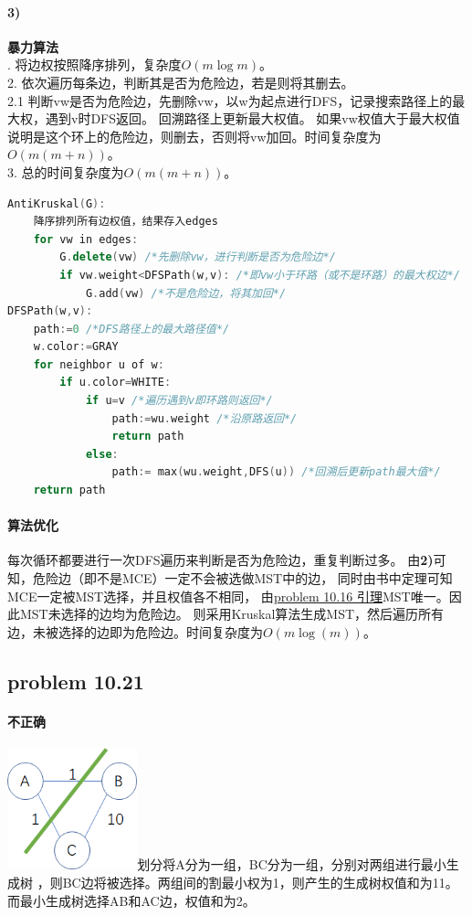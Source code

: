 \documentclass[11pt,a4paper,oneside,oldfontcommands]{ctexart}
\begin{document}
\paragraph*{3)}
\textbf{暴力算法}\\
. 将边权按照降序排列，复杂度$O(m\log m)$。\\
2. 依次遍历每条边，判断其是否为危险边，若是则将其删去。\\
2.1 判断vw是否为危险边，先删除vw，以w为起点进行DFS，记录搜索路径上的最大权，遇到v时DFS返回。
回溯路径上更新最大权值。
如果vw权值大于最大权值说明是这个环上的危险边，则删去，否则将vw加回。时间复杂度为$O(m(m+n))$。\\
3. 总的时间复杂度为$O(m(m+n))$。\\
\newpage
\begin{lstlisting}[language=C++,title=AntiKruskal.func]
AntiKruskal(G):
	降序排列所有边权值，结果存入edges
	for vw in edges:
		G.delete(vw) /*先删除vw，进行判断是否为危险边*/
		if vw.weight<DFSPath(w,v): /*即vw小于环路（或不是环路）的最大权边*/
			G.add(vw) /*不是危险边，将其加回*/
DFSPath(w,v):
	path:=0 /*DFS路径上的最大路径值*/
	w.color:=GRAY
	for neighbor u of w:
		if u.color=WHITE:
			if u=v /*遍历遇到v即环路则返回*/
				path:=wu.weight /*沿原路返回*/
				return path
			else:
				path:= max(wu.weight,DFS(u)) /*回溯后更新path最大值*/
	return path
\end{lstlisting}
\paragraph*{算法优化}
每次循环都要进行一次DFS遍历来判断是否为危险边，重复判断过多。
由\textbf{2)}可知，危险边（即不是MCE）一定不会被选做MST中的边，
同时由书中定理可知MCE一定被MST选择，并且权值各不相同，
由\hyperlink{problem1016}{problem 10.16 引理}MST唯一。因此MST未选择的边均为危险边。
则采用Kruskal算法生成MST，然后遍历所有边，未被选择的边即为危险边。时间复杂度为$O(m\log(m))$。
{\subsection*{problem 10.21}}
\paragraph*{不正确}
\includegraphics[height=100pt]{10-21.png}划分将A分为一组，BC分为一组，分别对两组进行最小生成树
，则BC边将被选择。两组间的割最小权为1，则产生的生成树权值和为11。而最小生成树选择AB和AC边，权值和为2。
\newpage
\end{document}
